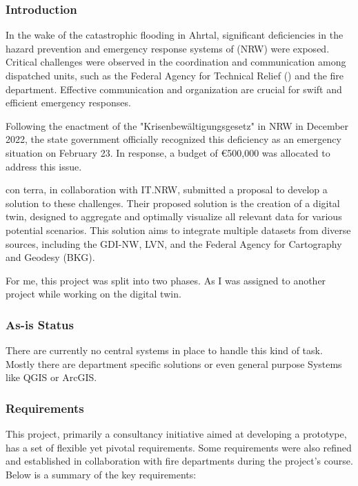 \documentclass[11pt, titlepage, a4paper]{article}
\begin{document}
\subsubsection{Introduction}
In the wake of the catastrophic flooding in Ahrtal, significant deficiencies in the hazard prevention and emergency response systems of (NRW) were exposed. Critical challenges were observed in the coordination and communication among dispatched units, such as the Federal Agency for Technical Relief () and the fire department. Effective communication and organization are crucial for swift and efficient emergency responses.

Following the enactment of the "Krisenbewältigungsgesetz" in NRW in December 2022, the state government officially recognized this deficiency as an emergency situation on February 23. In response, a budget of €500,000 was allocated to address this issue.

con terra, in collaboration with IT.NRW, submitted a proposal to develop a solution to these challenges. Their proposed solution is the creation of a digital twin, designed to aggregate and optimally visualize all relevant data for various potential scenarios. This solution aims to integrate multiple datasets from diverse sources, including the GDI-NW, LVN, and the Federal Agency for Cartography and Geodesy (BKG).

For me, this project was split into two phases. As I was assigned to another project while working on the digital twin.

\subsubsection{As-is Status}
There are currently no central systems in place to handle this kind of task. Mostly there are department specific solutions or even general purpose Systems like QGIS or ArcGIS.


\subsubsection{Requirements}
This project, primarily a consultancy initiative aimed at developing a prototype, has a set of flexible yet pivotal requirements. Some requirements were also refined and established in collaboration with fire departments during the project's course. Below is a summary of the key requirements:
\end{document}
